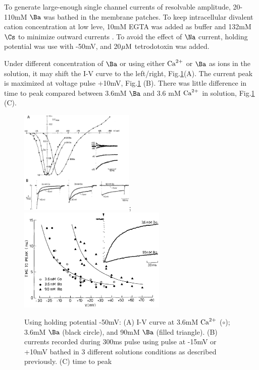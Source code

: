 To generate large-enough single channel currents of resolvable amplitude,
20-110mM $\Ba$ was bathed in the membrane patches. To keep intracellular
divalent cation concentration at low leve, 10mM EGTA was added as buffer and
132mM $\Cs$ to minimize outward currents \citep{mcdonald1986}. To avoid the
effect of $\Na$ current, holding potential was use with -50mV, and 20${\mu\text{M}}$
tetrodotoxin was added.

Under different concentration of $\Ba$ or using either ${\text{Ca}^{2+}}$ or $\Ba$ as ions
in the solution, it may shift the I-V  curve to the left/right,
Fig.\ref{fig:ICaL_McDonald1986}(A). The current peak is maximized at voltage
pulse +10mV, Fig.\ref{fig:ICaL_McDonald1986} (B). There was little difference in
time to peak compared between 3.6mM $\Ba$ and 3.6 mM ${\text{Ca}^{2+}}$ in solution,
Fig.\ref{fig:ICaL_McDonald1986} (C).


\begin{figure}[hbt]
  \centerline{\includegraphics[height=5cm,
    angle=0]{./images/ICaL_McDonald1986.eps}; \includegraphics[height=5cm,
    angle=0]{./images/ICaL_time2peak_McDonald1986.eps}}
\caption{Using holding potential -50mV: (A) I-V  curve at 3.6mM ${\text{Ca}^{2+}}$
($\circ$); 3.6mM $\Ba$ (black circle), and 90mM $\Ba$ (filled triangle). (B)
currents recorded during 300ms pulse using pulse at -15mV or +10mV bathed in
3 different solutions conditions as described previously. (C) time to peak}
\label{fig:ICaL_McDonald1986}
\end{figure}



